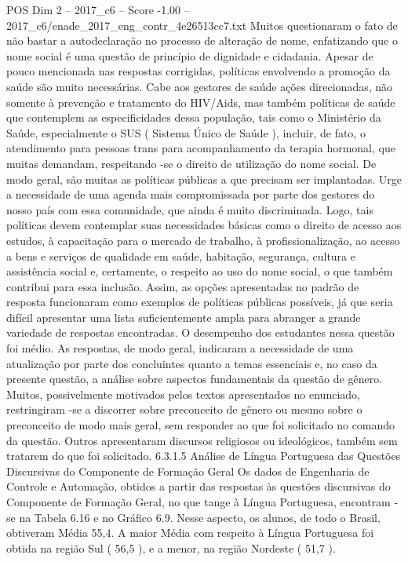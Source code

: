 \begin{textsample}{POS Dim 2 – 2017\_c6 – Score -1.00 – 2017\_c6/enade\_2017\_eng\_contr\_4e26513cc7.txt}
Muitos questionaram o fato de não bastar a autodeclaração no processo de alteração de nome, enfatizando que o nome social é uma questão de princípio de dignidade e cidadania.
Apesar de pouco mencionada nas respostas corrigidas, políticas envolvendo a promoção da saúde são muito necessárias.
Cabe aos gestores de saúde ações direcionadas, não somente à prevenção e tratamento do HIV/Aids, mas também políticas de saúde que contemplem as especificidades dessa população, tais como o Ministério da Saúde, especialmente o SUS ( Sistema Único de Saúde ), incluir, de fato, o atendimento para pessoas trans para acompanhamento da terapia hormonal, que muitas demandam, respeitando -se o direito de utilização do nome social.
De modo geral, são muitas as políticas públicas a que precisam ser implantadas.
Urge a necessidade de uma agenda mais compromissada por parte dos gestores do nosso país com essa comunidade, que ainda é muito discriminada.
Logo, tais políticas devem contemplar suas necessidades básicas como o direito de acesso aos estudos, à capacitação para o mercado de trabalho, à profissionalização, ao acesso a bens e serviços de qualidade em saúde, habitação, segurança, cultura e assistência social e, certamente, o respeito ao uso do nome social, o que também contribui para essa inclusão.
Assim, as opções apresentadas no padrão de resposta funcionaram como exemplos de políticas públicas possíveis, já que seria difícil apresentar uma lista suficientemente ampla para abranger a grande variedade de respostas encontradas.
O desempenho dos estudantes nessa questão foi médio.
As respostas, de modo geral, indicaram a necessidade de uma atualização por parte dos concluintes quanto a temas essenciais e, no caso da presente questão, a análise sobre aspectos fundamentais da questão de gênero.
Muitos, possivelmente motivados pelos textos apresentados no enunciado, restringiram -se a discorrer sobre preconceito de gênero ou mesmo sobre o preconceito de modo mais geral, sem responder ao que foi solicitado no comando da questão.
Outros apresentaram discursos religiosos ou ideológicos, também sem tratarem do que foi solicitado. 6.3.1.5 Análise de Língua Portuguesa das Questões Discursivas do Componente de Formação Geral Os dados de Engenharia de Controle e Automação, obtidos a partir das respostas às questões discursivas do Componente de Formação Geral, no que tange à Língua Portuguesa, encontram -se na Tabela 6.16 e no Gráfico 6.9.
Nesse aspecto, os alunos, de todo o Brasil, obtiveram Média 55,4.
A maior Média com respeito à Língua Portuguesa foi obtida na região Sul ( 56,5 ), e a menor, na região Nordeste ( 51,7 ).

\end{textsample}
